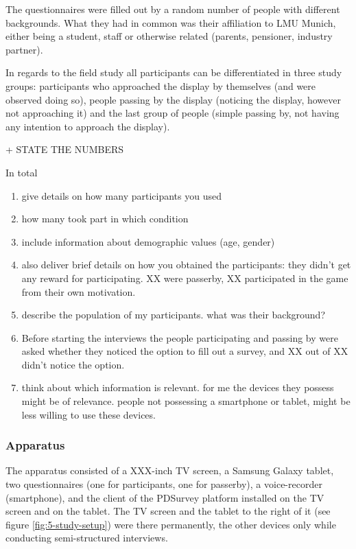 		The questionnaires were filled out by a random number of people with different backgrounds. What they had in common was their affiliation to LMU Munich, either being a student, staff or otherwise related (parents, pensioner, industry partner).

		In regards to the field study all participants can be differentiated in three study groups: participants who approached the display by themselves (and were observed doing so), people passing by the display (noticing the display, however not approaching it) and the last group of people (simple passing by, not having any intention to approach the display).

		+ STATE THE NUMBERS

		In total 

		\begin{enumerate}
		\item give details on how many participants you used
		\item how many took part in which condition
		\item include information about demographic values (age, gender)
		\item also deliver brief details on how you obtained the participants: they didn't get any reward for participating. XX were passerby, XX participated in the game from their own motivation.
		\item describe the population of my participants. what was their background?
		\item  Before starting the interviews the people participating and passing by were asked whether they noticed the option to fill out a survey, and XX out of XX didn't notice the option. 
		\item think about which information is relevant. for me the devices they possess might be of relevance. people not possessing a smartphone or tablet, might be less willing to use these devices.  
		\end{enumerate}

	\subsubsection{Apparatus}

		The apparatus consisted of a XXX-inch TV screen, a Samsung Galaxy tablet, two questionnaires (one for participants, one for passerby), a voice-recorder (smartphone), and the client of the PDSurvey platform installed on the TV screen and on the tablet. The TV screen and the tablet to the right of it (see figure \ref{fig:5-study-setup}) were there permanently, the other devices only while conducting semi-structured interviews.

